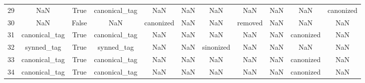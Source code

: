 \begin{table}[h!]
{\begin{tabular}{|c|c|c|c|c|c|c|c|c|c|c|}
         29 &                       NaN &                              True &                canonical\_tag &                                  NaN &                                  NaN &                                  NaN &                                  NaN &                                  NaN &                                  NaN &                                          canonized \\
         30 &                       NaN &                             False &                          NaN &                            canonized &                                  NaN &                                  NaN &                              removed &                                  NaN &                                  NaN &                                                NaN \\
         31 &             canonical\_tag &                              True &                canonical\_tag &                                  NaN &                                  NaN &                                  NaN &                                  NaN &                                  NaN &                            canonized &                                                NaN \\
         32 &                synned\_tag &                              True &                   synned\_tag &                                  NaN &                                  NaN &                            sinonized &                                  NaN &                                  NaN &                                  NaN &                                                NaN \\
         33 &             canonical\_tag &                              True &                canonical\_tag &                                  NaN &                                  NaN &                                  NaN &                                  NaN &                                  NaN &                            canonized &                                                NaN \\
         34 &             canonical\_tag &                              True &                canonical\_tag &                                  NaN &                                  NaN &                                  NaN &                                  NaN &                                  NaN &                            canonized &                                                NaN \\

\end{tabular}}
\end{table}
